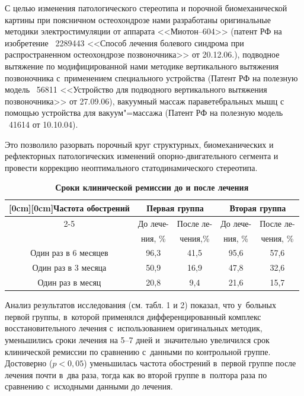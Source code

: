 С целью изменения патологического стереотипа и порочной биомеханической
картины при поясничном остеохондрозе нами разработаны оригинальные методики
электростимуляции от аппарата <<Миотон--604>> (патент РФ на изобретение \No~2289443
<<Способ лечения болевого синдрома при распространенном остеохондрозе позвоночника>> от 20.12.06.),
подводное вытяжение по модифицированной нами методике вертикального вытяжения позвоночника
с~применением специального устройства (Патент РФ на полезную модель \No~56811
<<Устройство для подводного вертикального вытяжения позвоночника>> от 27.09.06),
вакуумный массаж параветебральных мышц с помощью устройства для вакуум"=массажа
(Патент РФ на полезную модель \No~41614 от 10.10.04).

Это позволило разорвать порочный круг структурных, биомеханических и
рефлекторных патологических изменений опорно-двигательного сегмента и
провести коррекцию неоптимального статодинамического стереотипа.



\begin{table}[t!] \centering
\begin{minipage}{.9\textwidth}

\footnotesize
\centering
\caption{\bf Сроки клинической ремиссии до и после лечения} \vspace{-3mm}
\begin{tabular}{c|c|c|c|c}
\hline
\raisebox{-3ex}[0cm][0cm]{Частота обострений}&
\multicolumn{2}{|c|}{Первая группа} &
\multicolumn{2}{|c}{Вторая группа}  \\
\cline{2-5}
 &
До лече-&
После ле-&
До лече-&
После ле-\\
 &
ния, {\%}&
чения,{\%}&
ния, {\%}&
чения, {\%} \\
\hline
Один раз в 6 месяцев&
96,3&
41,5&
95,6&
57,6 \\
Один раз в 3 месяца&
50,9&
16,9&
47,8&
32,6 \\
Один раз в месяц&
20,8&
9,4&
21,6&
15,7 \\
\hline
\end{tabular}
\end{minipage}
\end{table}


Анализ результатов исследования (см. табл. 1 и 2) показал, что у~больных первой группы,
в~которой применялся дифференцированный комплекс восстановительного лечения
с~использованием оригинальных методик, уменьшились сроки лечения на 5--7 дней
и~значительно увеличился срок клинической ремиссии по сравнению с~данными по
контрольной группе.
Достоверно ($p<0,05$) уменьшилась частота обострений в~первой группе после лечения почти в~два раза,
тогда как во второй группе в~полтора раза по сравнению с~исходными данными до лечения.


